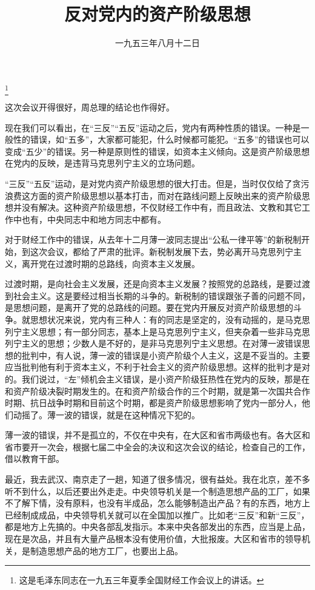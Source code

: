 
\title{反对党内的资产阶级思想}
\date{一九五三年八月十二日}
\thanks{这是毛泽东同志在一九五三年夏季全国财经工作会议上的讲话。}
\maketitle


这次会议开得很好，周总理的结论也作得好。

现在我们可以看出，在“三反”“五反”运动之后，党内有两种性质的错误。一种是一般性的错误，如“五多”，大家都可能犯，什么时候都可能犯。“五多”的错误也可以变成“五少”的错误。另一种是原则性的错误，如资本主义倾向。这是资产阶级思想在党内的反映，是违背马克思列宁主义的立场问题。

“三反”“五反”运动，是对党内资产阶级思想的很大打击。但是，当时仅仅给了贪污浪费这方面的资产阶级思想以基本打击，而对在路线问题上反映出来的资产阶级思想并没有解决。这种资产阶级思想，不仅财经工作中有，而且政法、文教和其它工作中也有，中央同志中和地方同志中都有。

对于财经工作中的错误，从去年十二月薄一波同志提出“公私一律平等”的新税制开始，到这次会议，都给了严肃的批评。新税制发展下去，势必离开马克思列宁主义，离开党在过渡时期的总路线，向资本主义发展。

过渡时期，是向社会主义发展，还是向资本主义发展？按照党的总路线，是要过渡到社会主义。这是要经过相当长期的斗争的。新税制的错误跟张子善的问题不同，是思想问题，是离开了党的总路线的问题。要在党内开展反对资产阶级思想的斗争。就思想状况来说，党内有三种人：有的同志是坚定的，没有动摇的，是马克思列宁主义思想；有一部分同志，基本上是马克思列宁主义，但夹杂着一些非马克思列宁主义的思想；少数人是不好的，是非马克思列宁主义思想。在对薄一波错误思想的批判中，有人说，薄一波的错误是小资产阶级个人主义，这是不妥当的。主要应当批判他有利于资本主义，不利于社会主义的资产阶级思想。这样的批判才是对的。我们说过，“左”倾机会主义错误，是小资产阶级狂热性在党内的反映，那是在和资产阶级决裂时期发生的。在和资产阶级合作的三个时期，就是第一次国共合作时期、抗日战争时期和目前这个时期，都是资产阶级思想影响了党内一部分人，他们动摇了。薄一波的错误，就是在这种情况下犯的。

薄一波的错误，并不是孤立的，不仅在中央有，在大区和省市两级也有。各大区和省市要开一次会，根据七届二中全会的决议和这次会议的结论，检查自己的工作，借以教育干部。

最近，我去武汉、南京走了一趟，知道了很多情况，很有益处。我在北京，差不多听不到什么，以后还要出外走走。中央领导机关是一个制造思想产品的工厂，如果不了解下情，没有原料，也没有半成品，怎么能够制造出产品？有的东西，地方上已经制成成品，中央领导机关就可以在全国加以推广。比如老“三反”和新“三反”，都是地方上先搞的。中央各部乱发指示。本来中央各部发出的东西，应当是上品，现在是次品，并且有大量产品根本没有使用价值，大批报废。大区和省市的领导机关，是制造思想产品的地方工厂，也要出上品。


